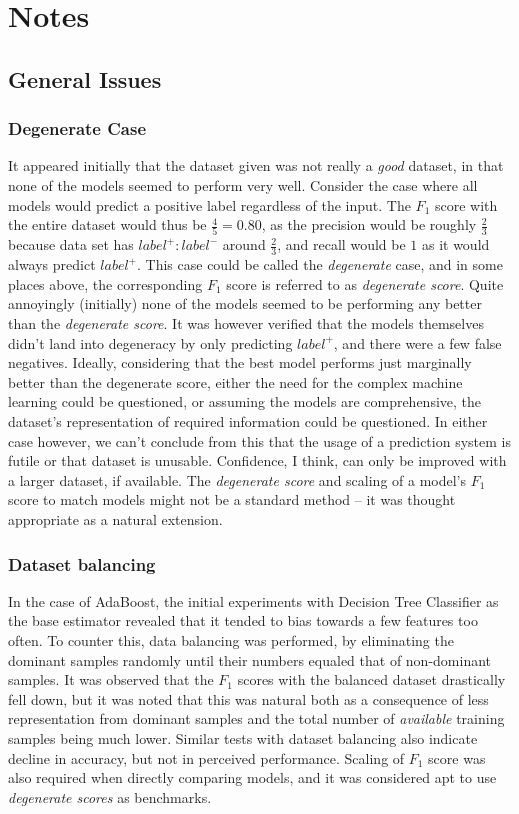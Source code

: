 \documentclass{article}
\begin{document}
	\section{Notes}
	
	\subsection{General Issues} \label{general_issues}
	
	\subsubsection{Degenerate Case}
	It appeared initially that the dataset given was not really a \emph{good} dataset, in that none of the models seemed to perform very well. Consider the case where all models would predict a positive label regardless of the input. The $F_1$ score with the entire dataset would thus be $\frac{4}{5} = 0.80$, as the precision would be roughly $\frac{2}{3}$ because data set has $label^+:label^-$ around $\frac{2}{3}$, and recall would be $1$ as it would always predict $label^+$. This case could be called the \emph{degenerate} case, and in some places above, the corresponding $F_1$ score is referred to as \emph{degenerate score}. Quite annoyingly (initially) none of the models seemed to be performing any better than the \emph{degenerate score}. It was however verified that the models themselves didn't land into degeneracy by only predicting $label^+$, and there were a few false negatives. Ideally, considering that the best model performs just marginally better than the degenerate score, either the need for the complex machine learning could be questioned, or assuming the models are comprehensive, the dataset's representation of required information could be questioned. In either case however, we can't conclude from this that the usage of a prediction system is futile or that dataset is unusable. Confidence, I think, can only be improved with a larger dataset, if available. The \emph{degenerate score} and scaling of a model's $F_1$ score to match models might not be a standard method -- it was thought appropriate as a natural extension.
	
	\subsubsection{Dataset balancing}
	In the case of AdaBoost, the initial experiments with Decision Tree Classifier as the base estimator revealed that it tended to bias towards a few features too often. To counter this, data balancing was performed, by eliminating the dominant samples randomly until their numbers equaled that of non-dominant samples. It was observed that the $F_1$ scores with the balanced dataset drastically fell down, but it was noted that this was natural both as a consequence of less representation from dominant samples and the total number of \emph{available} training samples being much lower. Similar tests with dataset balancing \cite{Olson2005} also indicate decline in accuracy, but not in perceived performance. Scaling of $F_1$ score was also required when directly comparing models, and it was considered apt to use \emph{degenerate scores} as benchmarks.
	
\end{document}
